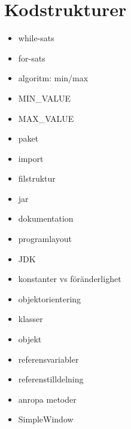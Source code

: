 \chapter{Kodstrukturer}
\begin{itemize}[nosep]
\item while-sats
\item for-sats
\item algoritm: min/max
\item MIN\_VALUE
\item MAX\_VALUE
\item paket
\item import
\item filstruktur
\item jar
\item dokumentation
\item programlayout
\item JDK
\item konstanter vs föränderlighet
\item objektorientering
\item klasser
\item objekt
\item referensvariabler
\item referenstilldelning
\item anropa metoder
\item SimpleWindow\end{itemize}